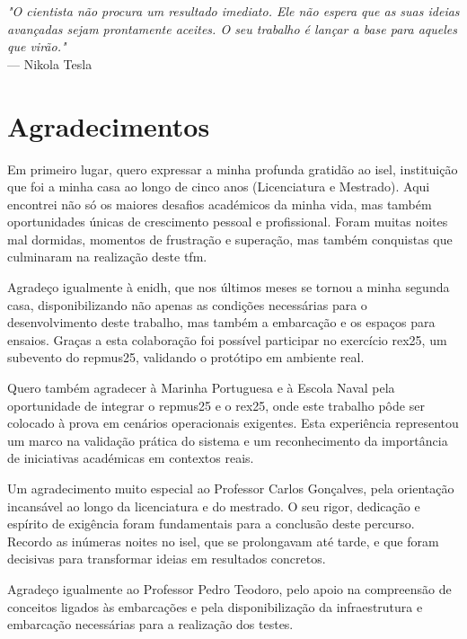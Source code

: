 \newpage
\vspace*{\fill}
\begin{flushright}
\textit{"O cientista não procura um resultado imediato. Ele não espera que as suas ideias avançadas sejam prontamente aceites. O seu trabalho é lançar a base para aqueles que virão."} \\
--- Nikola Tesla
\end{flushright}
\vspace*{\fill}

\chapter{Agradecimentos}

Em primeiro lugar, quero expressar a minha profunda gratidão ao \acrfull{isel}, instituição que foi a minha casa ao longo de cinco anos (Licenciatura e Mestrado). Aqui encontrei não só os maiores desafios académicos da minha vida, mas também oportunidades únicas de crescimento pessoal e profissional. Foram muitas noites mal dormidas, momentos de frustração e superação, mas também conquistas que culminaram na realização deste \acrfull{tfm}.  

Agradeço igualmente à \acrfull{enidh}, que nos últimos meses se tornou a minha segunda casa, disponibilizando não apenas as condições necessárias para o desenvolvimento deste trabalho, mas também a embarcação e os espaços para ensaios. Graças a esta colaboração foi possível participar no exercício \gls{rex25}, um subevento do \gls{repmus25}, validando o protótipo em ambiente real.  

Quero também agradecer à Marinha Portuguesa e à Escola Naval pela oportunidade de integrar o \gls{repmus25} e o \gls{rex25}, onde este trabalho pôde ser colocado à prova em cenários operacionais exigentes. Esta experiência representou um marco na validação prática do sistema e um reconhecimento da importância de iniciativas académicas em contextos reais.  

Um agradecimento muito especial ao Professor Carlos Gonçalves, pela orientação incansável ao longo da licenciatura e do mestrado. O seu rigor, dedicação e espírito de exigência foram fundamentais para a conclusão deste percurso. Recordo as inúmeras noites no \gls{isel}, que se prolongavam até tarde, e que foram decisivas para transformar ideias em resultados concretos.  

Agradeço igualmente ao Professor Pedro Teodoro, pelo apoio na compreensão de conceitos ligados às embarcações e pela disponibilização da infraestrutura e embarcação necessárias para a realização dos testes.  

